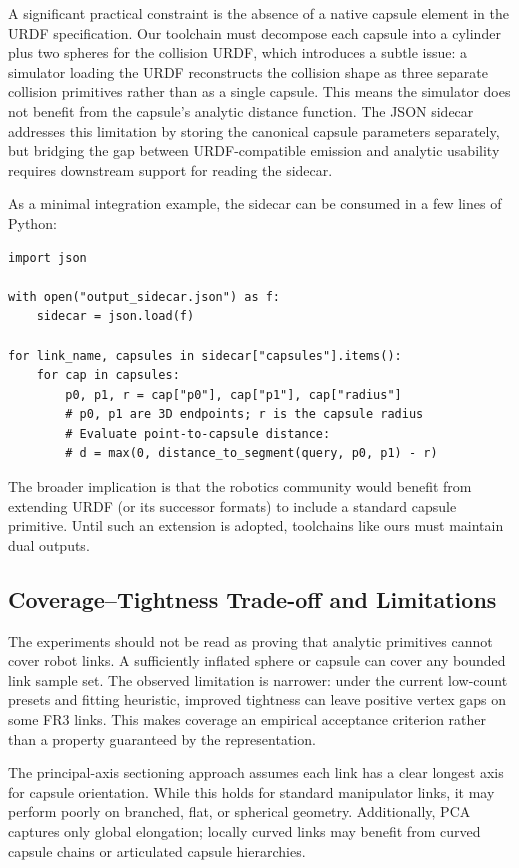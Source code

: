 A significant practical constraint is the absence of a native capsule element in the URDF specification.
Our toolchain must decompose each capsule into a cylinder plus two spheres for the collision URDF, which introduces a subtle issue: a simulator loading the URDF reconstructs the collision shape as three separate collision primitives rather than as a single capsule.
This means the simulator does not benefit from the capsule's analytic distance function.
The JSON sidecar addresses this limitation by storing the canonical capsule parameters separately, but bridging the gap between URDF-compatible emission and analytic usability requires downstream support for reading the sidecar.

As a minimal integration example, the sidecar can be consumed in a few lines of Python:
\begin{verbatim}
import json

with open("output_sidecar.json") as f:
    sidecar = json.load(f)

for link_name, capsules in sidecar["capsules"].items():
    for cap in capsules:
        p0, p1, r = cap["p0"], cap["p1"], cap["radius"]
        # p0, p1 are 3D endpoints; r is the capsule radius
        # Evaluate point-to-capsule distance:
        # d = max(0, distance_to_segment(query, p0, p1) - r)
\end{verbatim}

The broader implication is that the robotics community would benefit from extending URDF (or its successor formats) to include a standard capsule primitive.
Until such an extension is adopted, toolchains like ours must maintain dual outputs.

\subsection{Coverage--Tightness Trade-off and Limitations}

The experiments should not be read as proving that analytic primitives cannot cover robot links. A sufficiently inflated sphere or capsule can cover any bounded link sample set. The observed limitation is narrower: under the current low-count presets and fitting heuristic, improved tightness can leave positive vertex gaps on some FR3 links. This makes coverage an empirical acceptance criterion rather than a property guaranteed by the representation.

The principal-axis sectioning approach assumes each link has a clear longest axis for capsule orientation. While this holds for standard manipulator links, it may perform poorly on branched, flat, or spherical geometry. Additionally, PCA captures only global elongation; locally curved links may benefit from curved capsule chains or articulated capsule hierarchies.


